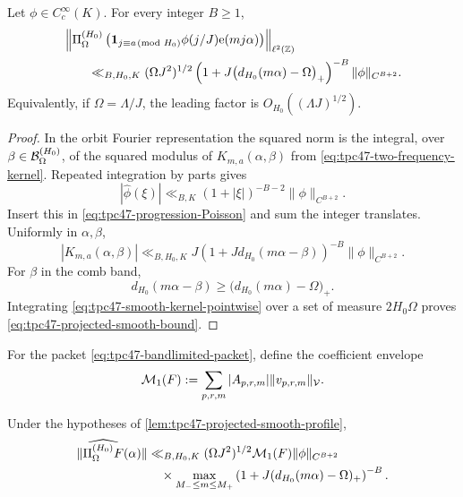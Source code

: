 \begin{lemma}
\label{lem:tpc47-projected-smooth-profile}
Let \(\phi\in C_c^\infty(K)\).  For every integer \(B\ge1\),
\begin{align}
 &\left\|
 \Pi_{\Omega}^{(H_0)}
 \left(
 \mathbf 1_{j\equiv a\!\!\pmod{H_0}}
 \phi(j/J)\mathrm e(mj\alpha)
 \right)
 \right\|_{\ell^2(\mathbb Z)}
 \notag\\
 &\qquad\ll_{B,H_0,K}
 (\Omega J^2)^{1/2}
 \left(1+J\bigl(d_{H_0}(m\alpha)-\Omega\bigr)_+\right)^{-B}
 \|\phi\|_{C^{B+2}}.
 \label{eq:tpc47-projected-smooth-bound}
\end{align}
Equivalently, if \(\Omega=\Lambda/J\), the leading factor is
\(O_{H_0}((\Lambda J)^{1/2})\).
\end{lemma}

\begin{proof}
In the orbit Fourier representation the squared norm is the integral,
over \(\beta\in\mathcal B_{\Omega}^{(H_0)}\), of the squared modulus of
\(K_{m,a}(\alpha,\beta)\) from
\eqref{eq:tpc47-two-frequency-kernel}.  Repeated integration by parts
gives
\[
 |\widehat\phi(\xi)|
 \ll_{B,K}(1+|\xi|)^{-B-2}\|\phi\|_{C^{B+2}}.
\]
Insert this in \eqref{eq:tpc47-progression-Poisson} and sum the
integer translates.  Uniformly in \(\alpha,\beta\),
\begin{equation}
 |K_{m,a}(\alpha,\beta)|
 \ll_{B,H_0,K}
 J\left(1+Jd_{H_0}(m\alpha-\beta)\right)^{-B}
 \|\phi\|_{C^{B+2}}.
 \label{eq:tpc47-smooth-kernel-pointwise}
\end{equation}
For \(\beta\) in the comb band,
\[
 d_{H_0}(m\alpha-\beta)
 \ge\bigl(d_{H_0}(m\alpha)-\Omega\bigr)_+.
\]
Integrating \eqref{eq:tpc47-smooth-kernel-pointwise} over a set of
measure \(2H_0\Omega\) proves
\eqref{eq:tpc47-projected-smooth-bound}.
\end{proof}

For the packet \eqref{eq:tpc47-bandlimited-packet}, define the
coefficient envelope
\begin{equation}
 \mathcal M_1(F):=\sum_{p,r,m}|A_{p,r,m}|\|v_{p,r,m}\|_{\mathcal V}.
 \label{eq:tpc47-l1-envelope}
\end{equation}

\begin{corollary}
\label{cor:tpc47-direct-smooth-packet}
Under the hypotheses of
\cref{lem:tpc47-projected-smooth-profile},
\begin{align}
 \|\widehat{\Pi_{\Omega}^{(H_0)}F}(\alpha)\|
 &\ll_{B,H_0,K}
 (\Omega J^2)^{1/2}\mathcal M_1(F)\|\phi\|_{C^{B+2}}
 \notag\\
 &\quad\times
 \max_{M_-\le m\le M_+}
 \left(1+J(d_{H_0}(m\alpha)-\Omega)_+\right)^{-B}.
 \label{eq:tpc47-direct-smooth-packet-bound}
\end{align}
\end{corollary}


